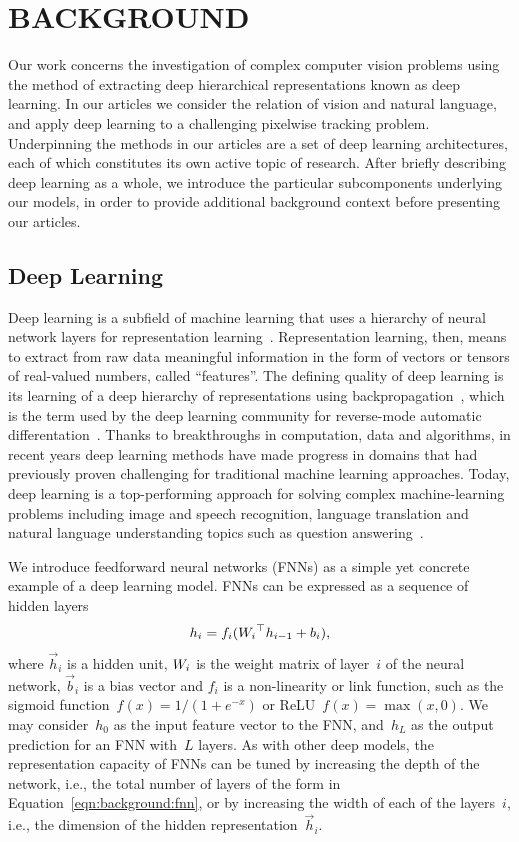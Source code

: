 \chapter{BACKGROUND}

Our work concerns the investigation of complex computer vision problems using
the method of extracting deep hierarchical representations known as deep
learning.
In our articles we consider the relation of vision and natural language, and
apply deep learning to a challenging pixelwise tracking problem.
Underpinning the methods in our articles are a set of deep learning
architectures, each of which constitutes its own active topic of research.
After briefly describing deep learning as a whole, we introduce the particular
subcomponents underlying our models, in order to provide additional background
context before presenting our articles.


\section{Deep Learning}

Deep learning is a subfield of machine learning that uses a hierarchy of neural
network layers for representation learning~\cite{lecun2015deeplearning}.
Representation learning, then, means to extract from raw data meaningful
information in the form of vectors or tensors of real-valued numbers, called
``features''.
The defining quality of deep learning is its learning of a deep hierarchy of
representations using backpropagation~\cite{rumelhart1988learningreps}, which
is the term used by the deep learning community for reverse-mode automatic
differentation~\cite{griewank2008evaluatingderivatives}.
Thanks to breakthroughs in computation, data and algorithms, in recent years
deep learning methods have made progress in domains that had previously proven
challenging for traditional machine learning approaches.
Today, deep learning is a top-performing approach for solving complex
machine-learning problems including image and speech recognition, language
translation and natural language understanding topics such as question
answering~\cite{lecun2015deeplearning}.

We introduce feedforward neural networks (FNNs) as a simple yet concrete
example of a deep learning model.
FNNs can be expressed as a sequence of hidden layers
\begin{equation}
h_i = f_i({W_i}^\top h_{i - 1} + b_i),
\label{eqn:background:fnn}
\end{equation}
where $\vec{h}_i$ is a hidden unit, $W_i$ is the weight matrix of
layer~$i$ of the neural network, $\vec{b}_i$ is a bias vector and $f_i$ is a
non-linearity or link function, such as the sigmoid
function~$f(x) = 1/(1 + e^{-x})$ or ReLU~$f(x) = \max(x, 0)$.
We may consider~$h_0$ as the input feature vector to the FNN, and~$h_L$ as the
output prediction for an FNN with~$L$ layers.
As with other deep models, the representation capacity of FNNs can be tuned by
increasing the depth of the network, i.e., the total number of layers of the
form in Equation~\ref{eqn:background:fnn}, or by increasing the width of each
of the layers~$i$, i.e., the dimension of the hidden
representation~$\vec{h}_i$.

